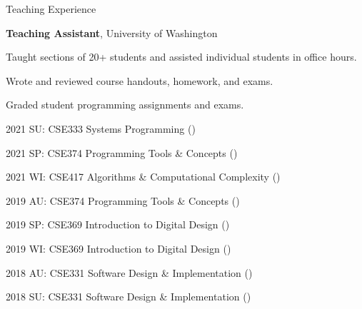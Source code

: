 \begin{rubric}{Teaching Experience}

%
	\textbf{Teaching Assistant}, University of Washington
	\par Taught sections of 20+ students and assisted individual students in office hours.
	\par Wrote and reviewed course handouts, homework, and exams.
	\par Graded student programming assignments and exams.
	\par 2021 SU: CSE333 Systems Programming (\pWangC{})
	\par 2021 SP: CSE374 Programming Tools \& Concepts (\pHazenM{})
	\par 2021 WI: CSE417 Algorithms \& Computational Complexity (\pWeberR{})
	\par 2019 AU: CSE374 Programming Tools \& Concepts (\pPirtleT{})
	\par 2019 SP: CSE369 Introduction to Digital Design (\pHsiaJ{})
	\par 2019 WI: CSE369 Introduction to Digital Design (\pHsiaJ{})
	\par 2018 AU: CSE331 Software Design \& Implementation (\pErnstM{})
	\par 2018 SU: CSE331 Software Design \& Implementation (\pPerlmutterL{})
\end{rubric}